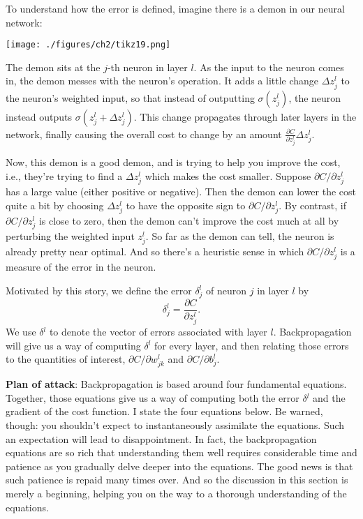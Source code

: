 \documentclass[a4paper,twoside,10pt]{book}
\begin{document}
To understand how the error is defined, imagine there is a demon in our neural network:

\begin{center}
	\texttt{[image: ./figures/ch2/tikz19.png]}
\end{center}
The demon sits at the $j$-th neuron in layer $l$. As the input to the neuron comes in, the demon messes with the neuron's operation. It adds a little change $\Delta{}z^l_j$ to the neuron's weighted input, so that instead of outputting $\sigma(z^l_j)$, the neuron instead outputs $\sigma(z^l_j+\Delta{}z^l_j)$. This change propagates through later layers in the network, finally causing the overall cost to change by an amount $\frac{\partial{}C}{\partial{}z^l_j}\Delta{}z^l_j$.

Now, this demon is a good demon, and is trying to help you improve the cost, i.e., they're trying to find a $\Delta{}z^l_j$ which makes the cost smaller. Suppose $\partial{}C/\partial{}z^l_j$ has a large value (either positive or negative). Then the demon can lower the cost quite a bit by choosing $\Delta{}z^l_j$ to have the opposite sign to $\partial{}C/\partial{}z^l_j$. By contrast, if $\partial{}C/\partial{}z^l_j$ is close to zero, then the demon can't improve the cost much at all by perturbing the weighted input $z^l_j$. So far as the demon can tell, the neuron is already pretty near optimal. And so there's a heuristic sense in which $\partial{}C/\partial{}z^l_j$ is a measure of the error in the neuron.

Motivated by this story, we define the error $\delta^l_j$ of neuron $j$ in layer $l$ by
\begin{equation}
	\delta^l_j = \frac{\partial{}C}{\partial{}z^l_j}.\tag{29}\label{eq:29}
\end{equation}
We use $\delta{}^l$ to denote the vector of errors associated with layer $l$. Backpropagation will give us a way of computing $\delta{}^l$ for every layer, and then relating those errors to the quantities of interest, $\partial{}C/\partial{}w^l_{jk}$ and $\partial{}C/\partial{}b^l_j$.

\textbf{Plan of attack}: Backpropagation is based around four fundamental equations. Together, those equations give us a way of computing both the error $\delta{}^l$ and the gradient of the cost function. I state the four equations below. Be warned, though: you shouldn't expect to instantaneously assimilate the equations. Such an expectation will lead to disappointment. In fact, the backpropagation equations are so rich that understanding them well requires considerable time and patience as you gradually delve deeper into the equations. The good news is that such patience is repaid many times over. And so the discussion in this section is merely a beginning, helping you on the way to a thorough understanding of the equations.
\end{document}

